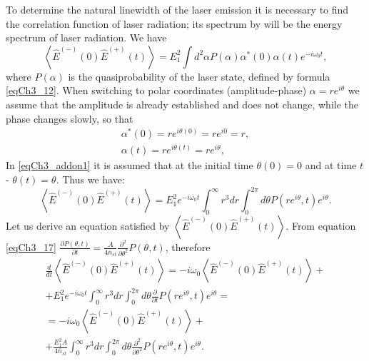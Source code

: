 To determine the natural linewidth of the laser emission
it is necessary to find the correlation function of laser radiation; its spectrum by
 will be
the energy spectrum of laser radiation. We have
\begin{equation}
\left<\hat{E}^{(-)}\left(0\right)\hat{E}^{(+)}\left(t\right)\right>
= E_1^2\int d^2\alpha P\left(\alpha\right) \alpha^{*}\left(0\right)\alpha\left(t\right) e^{-i
  \omega_0 t},
\nonumber
\end{equation}
where $P\left(\alpha\right)$ is the quasiprobability of the laser state,
defined by formula \eqref{eqCh3_12}. 
When switching to polar coordinates
(amplitude-phase) $\alpha = r e^{i \theta}$
we assume that the amplitude is already
established and does not change, while the phase changes slowly, so that 
\begin{eqnarray}
\alpha^{*}\left(0\right) = r e^{i\theta\left(0\right)} = r e^{i 0} = r,
\nonumber \\
\alpha\left(t\right) = r e^{i\theta\left(t\right)} = r e^{i \theta},
\label{eqCh3_addon1}
\end{eqnarray}
In \eqref{eqCh3_addon1} it is assumed that at the initial time 
$\theta\left(0\right) = 0$ and at time $t$ - $\theta\left(t\right) = \theta$.
Thus we have:
\begin{equation}
\left<\hat{E}^{(-)}\left(0\right)\hat{E}^{(+)}\left(t\right)\right>
= E_1^2 e^{-i
  \omega_0 t}\int_0^{\infty}r^3 d r \int_0^{2 \pi}d \theta P\left(r
e^{i \theta}, t\right) e^{i \theta}.
\nonumber
\end{equation}
Let us derive an equation satisfied by 
$\left<\hat{E}^{(-)}\left(0\right)\hat{E}^{(+)}\left(t\right)\right>$. 
From equation \eqref{eqCh3_17}
\(
\frac{\partial P \left(\theta, t\right)}{\partial t} = 
\frac{A}{4 \bar{n}_{st}}
\frac{\partial^2}{\partial \theta^2}
P \left(\theta, t\right)
\),
therefore
\begin{eqnarray}
\frac{d}{dt}\left<\hat{E}^{(-)}\left(0\right)\hat{E}^{(+)}\left(t\right)\right>
= -i \omega_0
\left<\hat{E}^{(-)}\left(0\right)\hat{E}^{(+)}\left(t\right)\right>+
\nonumber \\
+ E_1^2 e^{-i
  \omega_0 t}\int_0^{\infty}r^3 d r \int_0^{2 \pi}d \theta
\frac{\partial}{\partial t}P\left(r
e^{i \theta}, t\right) e^{i \theta}
=
\nonumber \\
=
-i \omega_0
\left<\hat{E}^{(-)}\left(0\right)\hat{E}^{(+)}\left(t\right)\right>+
\nonumber \\ 
+
\frac{E_1^2 A}{4 \bar{n}_{st}} 
\int_0^{\infty}r^3 d r 
\int_0^{2 \pi}
d \theta
\frac{\partial^2}{\partial \theta^2}P\left(r
e^{i \theta}, t\right) e^{i \theta}.
\label{eqPart2Ch1_add84_1}
\end{eqnarray}
